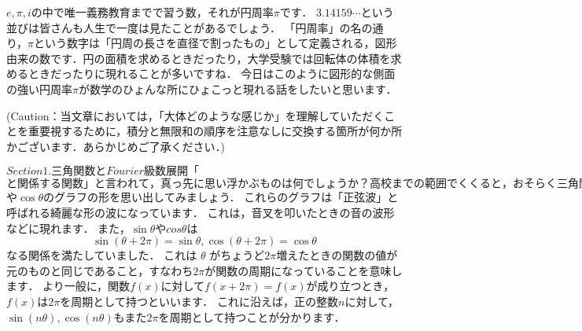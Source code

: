 



$e, \pi , i$の中で唯一義務教育までで習う数，それが円周率$\pi$です．
$3.14159 \cdots$という並びは皆さんも人生で一度は見たことがあるでしょう．
「円周率」の名の通り，$\pi$という数字は「円周の長さを直径で割ったもの」として定義される，図形由来の数です．円の面積を求めるときだったり，大学受験では回転体の体積を求めるときだったりに現れることが多いですね．
今日はこのように図形的な側面の強い円周率$\pi$が数学のひょんな所にひょこっと現れる話をしたいと思います．

(Caution：当文章においては，「大体どのような感じか」を理解していただくことを重要視するために，積分と無限和の順序を注意なしに交換する箇所が何か所かございます．あらかじめご了承ください．)

$Section{1.三角関数とFourier級数展開}

「$\pi$と関係する関数」と言われて，真っ先に思い浮かぶものは何でしょうか？
高校までの範囲でくくると，おそらく三角関数を連想する人が一番多いのではないでしょうか．
そこで，最初はこの三角関数についてお話しようと思います．

まず三角関数，特に$\sin \theta$や\cos \theta$のグラフの形を思い出してみましょう．
これらのグラフは「正弦波」と呼ばれる綺麗な形の波になっています．
これは，音叉を叩いたときの音の波形などに現れます．
また，$\sin \theta$や$cos \theta$は
\[
\sin ( \theta +2 \pi )= \sin \theta, \cos( \theta +2 \pi )= \cos \theta
\]
なる関係を満たしていました．
これは $\theta$ がちょうど$2 \pi$増えたときの関数の値が元のものと同じであること，すなわち$2 \pi$が関数の周期になっていることを意味します．
より一般に，関数$f(x)$に対して$f(x+2 \pi )=f(x)$が成り立つとき，$f(x)$は$2 \pi$を周期として持つといいます．
これに沿えば，正の整数$n$に対して，$\sin (n \theta ), \cos (n \theta)$もまた$2 \pi$を周期として持つことが分かります．


